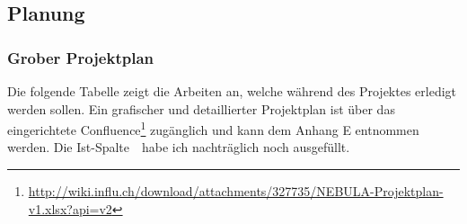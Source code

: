 \newpage
\subsection{Planung} 
\subsubsection{Grober Projektplan}
Die folgende Tabelle zeigt die Arbeiten an, welche während des Projektes erledigt werden sollen. Ein grafischer und detaillierter Projektplan ist über das eingerichtete Confluence\footnote{\url{http://wiki.influ.ch/download/attachments/327735/NEBULA-Projektplan-v1.xlsx?api=v2}} zugänglich und kann dem Anhang E entnommen werden. Die \grqq Ist-Spalte\grqq \ \  habe ich nachträglich noch ausgefüllt.


